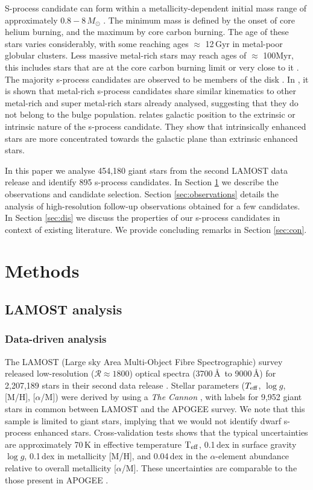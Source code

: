 \documentclass[a4paper,fleqn,usenatbib]{mnras}
\begin{document}
S-process candidate can form within a metallicity-dependent initial mass range of approximately $0.8 - 8\,M_{\odot}$ \citep{karakas2016cp}. The minimum mass is defined by the onset of core helium burning, and the maximum by core carbon burning. The age of these stars varies considerably, with some reaching ages $\approx$ 12\,Gyr in metal-poor globular clusters. Less massive metal-rich stars may reach ages of $\approx$ 100Myr, this includes stars that are at the core carbon burning limit or very close to it \citep[e.g.,][]{whitelock2013}. The majority s-process candidates are observed to be members of the disk \citep{jorissen1993,gomez1997,mennessier1997}. In \citet{pereira2011}, it is shown that metal-rich s-process candidates share similar kinematics to other metal-rich and super metal-rich stars already analysed, suggesting that they do not belong to the bulge population. \cite{jorissen1993} relates galactic position to the extrinsic or intrinsic nature of the s-process candidate. They show that intrinsically enhanced stars are more concentrated towards the galactic plane than extrinsic enhanced stars.

In this paper we analyse 454,180 giant stars from the second LAMOST data release \citep{luo2015} and identify 895 s-process candidates. In Section \ref{sec:methods} we describe the observations and candidate selection. Section \ref{sec:observations} details the analysis of high-resolution follow-up observations obtained for a few candidates. In Section \ref{sec:dis} we discuss the properties of our s-process candidates in context of existing literature. We provide concluding remarks in Section \ref{sec:con}.


\section{Methods} \label{sec:methods}
\subsection{LAMOST analysis}
\subsubsection{Data-driven analysis}
The LAMOST (Large sky Area Multi-Object Fibre Spectrographic) survey released low-resolution ($\mathcal{R} \approx 1800$) optical spectra (3700\,\AA\ to 9000\,\AA) for 2,207,189 stars in their second data release \citep{luo2015}. Stellar parameters ($T_{\rm eff}$, $\log{g}$, [M/H], [$\alpha$/M]) were derived by \citep{ho2017} using a \emph{The Cannon} \citet{ness2016}, with labels for 9,952 giant stars in common between LAMOST and the APOGEE survey. We note that this sample is limited to giant stars, implying that we would not identify dwarf s-process enhanced stars. Cross-validation tests shows that the typical uncertainties are approximately 70\,K in effective temperature $\rm T_{\rm eff}$, 0.1\,dex in surface gravity $\log{g}$, 0.1\,dex in metallicity [M/H], and 0.04\,dex in the $\alpha$-element abundance relative to overall metallicity [$\alpha$/M]. These uncertainties are comparable to the those present in APOGEE \citep{alam2015}.
\end{document}
